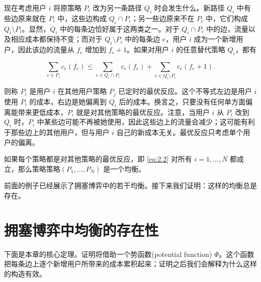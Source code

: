 现在考虑用户 \(i\) 将原策略 \({P}_{i}\) 改为另一条路径 \({Q}_{i}\) 时会发生什么。新路径 \({Q}_{i}\) 中有些边原来就在 \({P}_{i}\) 中，这些边构成 \({Q}_{i} \cap {P}_{i}\)；另一些边原来不在 \({P}_{i}\) 中，它们构成 \({Q}_{i} \setminus {P}_{i}\)。显然，\({Q}_{i}\) 中的每条边恰好属于这两类之一。对于 \({Q}_{i} \cap {P}_{i}\) 中的边，流量以及相应成本都保持不变；而对于 \({Q}_{i} \setminus {P}_{i}\) 中的每条边 \(e\)，用户 \(i\) 成为一个新增用户，因此该边的流量从 \({f}_{e}\) 增加到 \({f}_{e}+1\)。如果对用户 \(i\) 的任意替代策略 \({Q}_{i}\)，都有

\begin{equation}\label{eq:2.2}
\sum_{{e \in  {P}_{i}}}{c}_{e}\left( {f}_{e}\right)  \leq \sum _{{e \in  {Q}_{i} \cap  {P}_{i}}}{c}_{e}\left( {f}_{e}\right)  + \sum _{{e \in  {Q}_{i} \setminus  {P}_{i}}}{c}_{e}\left( {{f}_{e} + 1}\right) .
\end{equation}


则称 \({P}_{i}\) 是用户 \(i\) 在其他用户策略 \({P}_{j}\) 已定时的最优反应。这个不等式左边是用户 \(i\) 使用 \({P}_{i}\) 的成本，右边是她偏离到 \({Q}_{i}\) 后的成本。换言之，只要没有任何单方面偏离能带来更低成本，\({P}_{i}\) 就是对其他策略的最优反应。注意，当用户 \(i\) 从 \({P}_{i}\) 改到 \({Q}_{i}\) 时，\({P}_{i}\) 中某些边可能不再被她使用，因此这些边上的流量会减少；这可能有利于那些边上的其他用户，但与用户 \(i\) 自己的新成本无关。最优反应只考虑单个用户的偏离。
\begin{definition}\label{def:2.1}如果每个策略都是对其他策略的最优反应，即 \eqref{eq:2.2} 对所有 \(i = 1,\ldots ,N\) 都成立，那么策略策略\(({P}_{1},\ldots ,{P}_{N})\) 是一个均衡。
\end{definition}
前面的例子已经展示了拥塞博弈中的若干均衡。接下来我们证明：这样的均衡总是存在。
\section{拥塞博弈中均衡的存在性}\label{sec-2.5}
下面是本章的核心定理。证明将借助一个势函数(potential function) \(\Phi\)。这个函数把每条边上逐个新增用户所带来的成本累积起来；证明之后我们会解释为什么这样的构造有效。

